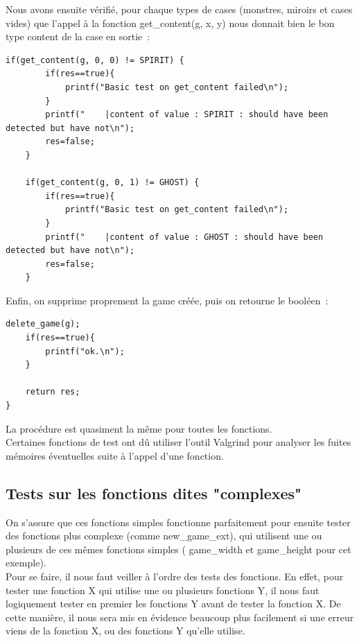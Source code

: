 \documentclass[12]{article}
\begin{document}
Nous avons ensuite vérifié, pour chaque types de cases (monstres, miroirs et cases vides) que l’appel à la fonction get\_content(g, x, y) nous donnait bien le bon type content de la case en sortie :
\begin{lstlisting}[style=CStyle]
    if(get_content(g, 0, 0) != SPIRIT) {
        if(res==true){
            printf("Basic test on get_content failed\n");
        }
        printf("	|content of value : SPIRIT : should have been detected but have not\n");
        res=false;
    }

    if(get_content(g, 0, 1) != GHOST) {
        if(res==true){
            printf("Basic test on get_content failed\n");
        }
        printf("	|content of value : GHOST : should have been detected but have not\n");
        res=false;
    }
\end{lstlisting}

Enfin, on supprime proprement la game créée, puis on retourne le booléen :

\begin{lstlisting}[style=CStyle]
    delete_game(g);
    if(res==true){
        printf("ok.\n");
    }

    return res;
}
\end{lstlisting}

La procédure est quasiment la même pour toutes les fonctions.\\

Certaines fonctions de test ont dû utiliser l’outil Valgrind pour analyser les fuites mémoires éventuelles suite à l’appel d’une fonction.
\subsection{Tests sur les fonctions dites "complexes"}
On s’assure que ces fonctions simples fonctionne parfaitement pour ensuite tester des fonctions plus complexe (comme new\_game\_ext), qui utilisent une ou plusieurs de ces mêmes fonctions simples ( game\_width et game\_height pour cet exemple).\\

Pour se faire, il nous faut veiller à l’ordre des tests des fonctions. En effet, pour tester une fonction X qui utilise une ou plusieurs fonctions Y, il nous faut logiquement tester en premier les fonctions Y avant de tester la fonction X. De cette manière, il nous sera mis en évidence beaucoup plus facilement si une erreur viens de la fonction X, ou des fonctions Y qu’elle utilise.\\
\end{document}

